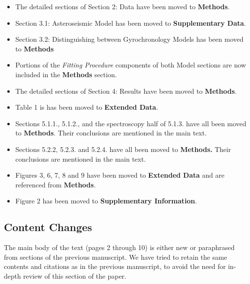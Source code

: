 \documentclass[11pt]{article}
\begin{document}
\begin{itemize}
	\item The detailed sections of Section 2: Data have been moved to \textbf{Methods}.
	\item Section 3.1: Asteroseismic Model has been moved to \textbf{Supplementary Data}.
	\item Section 3.2: Distinguishing between Gyrochronology Models has been moved to \textbf{Methods}
	\item Portions of the \textit{Fitting Procedure} components of both Model sections are now included in the \textbf{Methods} section.
	\item The detailed sections of Section 4: Results have been moved to \textbf{Methods}.
	\item Table 1 is has been moved to \textbf{Extended Data}.
	\item Sections 5.1.1., 5.1.2., and the spectroscopy half of 5.1.3. have all been moved to \textbf{Methods}. Their conclusions are mentioned in the main text.
	\item Sections 5.2.2, 5.2.3. and 5.2.4. have all been moved to \textbf{Methods.} Their conclusions are mentioned in the main text.
	\item Figures 3, 6, 7, 8 and 9 have been moved to \textbf{Extended Data} and are referenced from \textbf{Methods}.
	\item Figure 2 has been moved to \textbf{Supplementary Information}.
\end{itemize}

\subsection*{Content Changes}
The main body of the text (pages 2 through 10) is either new or paraphrased from sections of the previous manuscript. We have tried to retain the same contents and citations as in the previous manuscript, to avoid the need for in-depth review of this section of the paper.
\end{document}

